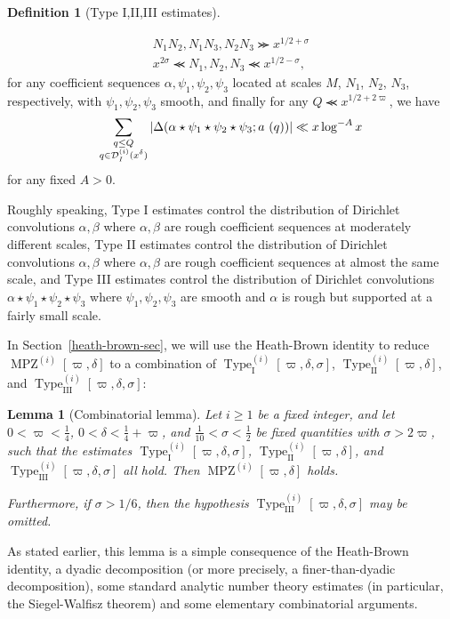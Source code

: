 \documentclass[12pt,a4paper,reqno]{amsart}
\numberwithin{equation}{section}
\DeclareMathOperator*\MPZ{MPZ}
\theoremstyle{plain}
\newtheorem{lemma}[theorem]{Lemma}
\theoremstyle{definition}
\newtheorem{definition}[theorem]{Definition}
\newcommand{\DI}[3]{\mathcal{D}_{{#1}}^{({#2})}({#3})}
\newcommand\TypeI{\operatorname{Type}_{\operatorname{I}}}
\newcommand\TypeII{\operatorname{Type}_{\operatorname{II}}}
\newcommand\TypeIII{\operatorname{Type}_{\operatorname{III}}}
\renewcommand{\lessapprox}{\llcurly}
\renewcommand{\gtrapprox}{\ggcurly}
\begin{document}
\begin{definition}[Type I,II,III estimates]
\begin{itemize}
\begin{gather}
\label{n1-o}
N_1 N_2, N_1 N_3, N_2 N_3 \gtrapprox x^{1/2+\sigma}
\\
\label{n2-o}
x^{2\sigma} \lessapprox N_1,N_2,N_3 \lessapprox x^{1/2-\sigma},
\end{gather}
for any coefficient sequences $\alpha,\psi_1,\psi_2,\psi_3$ located at scales $M$, $N_1$, $N_2$, $N_3$, respectively, with $\psi_1,\psi_2,\psi_3$ smooth, and
finally for any $Q \lessapprox x^{1/2+2\varpi}$, we have
\begin{equation}\label{psi}
\sum_{\substack{q\leq Q\\q \in \DI{I}{i}{x^\delta}}}
  |\Delta(\alpha \star \psi_1 \star \psi_2 \star \psi_3; a\ (q))|\\
\ll x \log^{-A} x
\end{equation}
for any fixed $A>0$.
\end{itemize}
\end{definition}

Roughly speaking, Type I estimates control the distribution of
Dirichlet convolutions $\alpha,\beta$ where $\alpha,\beta$ are rough
coefficient sequences at moderately different scales, Type II
estimates control the distribution of Dirichlet convolutions
$\alpha,\beta$ where $\alpha,\beta$ are rough coefficient sequences at
almost the same scale, and Type III estimates control the distribution
of Dirichlet convolutions $\alpha\star\psi_1\star\psi_2\star\psi_3$ where
$\psi_1,\psi_2,\psi_3$ are smooth and $\alpha$ is rough but supported
at a fairly small scale.  

In Section~\ref{heath-brown-sec}, we will use the Heath-Brown identity
to reduce $\MPZ^{(i)}[\varpi,\delta]$ to a combination of
$\TypeI^{(i)}[\varpi,\delta,\sigma]$, $\TypeII^{(i)}[\varpi,\delta]$,
and $\TypeIII^{(i)}[\varpi,\delta,\sigma]$:

\begin{lemma}[Combinatorial lemma]\label{comlem} Let $i \geq 1$ be a
  fixed integer, and let $0 < \varpi < \frac{1}{4}$, $0 < \delta <
  \frac{1}{4}+\varpi$, and $\frac{1}{10} < \sigma < \frac{1}{2}$ be
  fixed quantities with $\sigma > 2\varpi$, such that the estimates
  $\TypeI^{(i)}[\varpi,\delta,\sigma]$,
  $\TypeII^{(i)}[\varpi,\delta]$, and
  $\TypeIII^{(i)}[\varpi,\delta,\sigma]$ all hold.  Then
  $\MPZ^{(i)}[\varpi,\delta]$ holds.

Furthermore, if $\sigma > 1/6$, then the hypothesis $\TypeIII^{(i)}[\varpi,\delta,\sigma]$ may be omitted.
\end{lemma}

As stated earlier, this lemma is a simple consequence of the
Heath-Brown identity, a dyadic decomposition (or more precisely, a
finer-than-dyadic decomposition), some standard analytic number theory
estimates (in particular, the Siegel-Walfisz theorem) and some
elementary combinatorial arguments.
\end{document}
